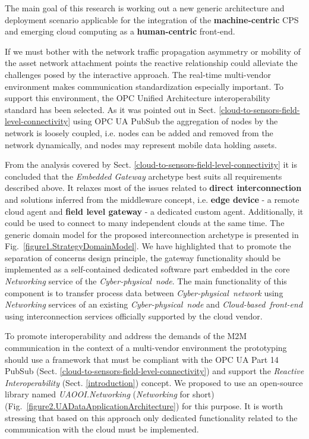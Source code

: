 \documentclass[runningheads]{llncs}
\begin{document}
The main goal of this research is working out a new generic architecture and deployment scenario applicable for the integration of the \textbf{machine-centric} CPS and emerging cloud computing as a \textbf{human-centric} front-end.

If we must bother with the network traffic propagation asymmetry or mobility of the asset network attachment points the reactive relationship \cite{mpostol2020} could alleviate the challenges posed by the interactive approach. The real-time multi-vendor environment makes communication standardization especially important. To support this environment, the OPC Unified Architecture \cite{RefWorks:doc:5ac86c98e4b009947bbb874c} interoperability standard has been selected. As it was pointed out in Sect. \ref{cloud-to-sensors-field-level-connectivity} using OPC UA PubSub \cite{RefWorks:doc:5d98837de4b055984c0eecf0} the aggregation of nodes by the network is loosely coupled, i.e. nodes can be added and removed from the network dynamically, and nodes may represent mobile data holding assets.

From the analysis covered by Sect. \ref{cloud-to-sensors-field-level-connectivity} it is concluded that the \emph{Embedded Gateway} archetype best suits all requirements described above. It relaxes most of the issues related to \textbf{direct interconnection} and solutions inferred from the middleware concept, i.e. \textbf{edge device} - a remote cloud agent and \textbf{field level gateway} - a dedicated custom agent. Additionally, it could be used to connect to many independent clouds at the same time. The generic domain model for the proposed interconnection archetype is presented in Fig.~\ref{figure1.StrategyDomainModel}. We have highlighted that to promote the separation of concerns design principle, the gateway functionality should be implemented as a self-contained dedicated software part embedded in the core \emph{Networking} service of the \emph{Cyber-physical\ node}. The main functionality of this component is to transfer process data between \emph{Cyber-physical\ network} using \emph{Networking} services of an existing \emph{Cyber-physical\ node} and \emph{Cloud-based\ front-end} using interconnection services officially supported by the cloud vendor.

To promote interoperability and address the demands of the M2M communication in the context of a multi-vendor environment the prototyping should use a framework that must be compliant with the OPC UA Part 14 PubSub (Sect. \ref{cloud-to-sensors-field-level-connectivity}) and support the \emph{Reactive Interoperability} (Sect. \ref{introduction}) concept. We proposed to use an open-source library named \emph{UAOOI.Networking} (\emph{Networking} for short) (Fig.~\ref{figure2.UADataApplicationArchitecture}) for this purpose. It is worth stressing that based on this approach only dedicated functionality related to the communication with the cloud must be implemented.
\end{document}
